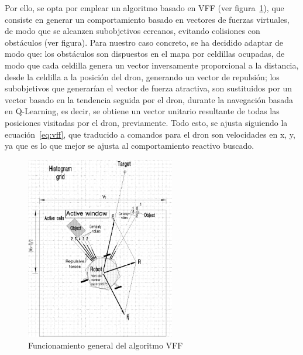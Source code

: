 Por ello, se opta por emplear un algoritmo basado en \ac{VFF} (ver figura~\ref{fig:vffwork}), que consiste en generar un comportamiento basado en vectores de fuerzas virtuales, de modo que se alcanzen subobjetivos cercanos, evitando colisiones con obstáculos (ver figura). Para nuestro caso concreto, se ha decidido adaptar de modo que: los obstáculos son dispuestos en el mapa por celdillas ocupadas, de modo que cada celdilla genera un vector inversamente proporcional a la distancia, desde la celdilla a la posición del dron, generando un vector de repulsión; los subobjetivos que generarían el vector de fuerza atractiva, son sustituidos por un vector basado en la tendencia seguida por el dron, durante la navegación basada en Q-Learning, es decir, se obtiene un vector unitario resultante de todas las posiciones visitadas por el dron, previamente. Todo esto, se ajusta siguiendo la ecuación~\ref{eq:vff}, que traducido a comandos para el dron son velocidades en x, y, ya que es lo que mejor se ajusta al comportamiento reactivo buscado.
\begin{figure} [tp]
    \begin{center}
    \includegraphics[height=8cm]{imagenes/cap4/30_vff.png}
    \end{center}
    \caption[Funcionamiento general del algoritmo \ac{VFF}]{Funcionamiento general del algoritmo \ac{VFF}}
    \label{fig:vffwork}
\end{figure}

